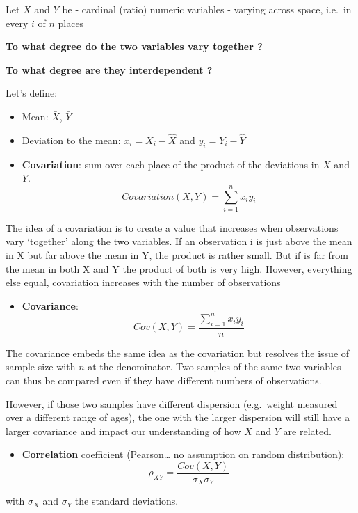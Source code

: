 \documentclass[
  letterpaper,
  DIV=11,
  numbers=noendperiod]{scrreprt}
\providecommand{\tightlist}{%
  \setlength{\itemsep}{0pt}\setlength{\parskip}{0pt}}\usepackage{longtable,booktabs,array}
\begin{document}
Let \(X\) and \(Y\) be - cardinal (ratio) numeric variables - varying
across space, i.e.~in every \(i\) of \(n\) places

\textbf{To what degree do the two variables vary together ?}

\textbf{To what degree are they interdependent ?}

Let's define:

\begin{itemize}
\item
  Mean: \(\bar{X}\), \(\bar{Y}\)
\item
  Deviation to the mean: \(x_i = X_i - \hat{X}\) and
  \(y_i = Y_i - \hat{Y}\)
\item
  \textbf{Covariation}: sum over each place of the product of the
  deviations in \(X\) and \(Y\).
  \[Covariation (X,Y) = \sum_{i=1}^n x_i y_i\]
\end{itemize}

The idea of a covariation is to create a value that increases when
observations vary `together' along the two variables. If an observation
i is just above the mean in X but far above the mean in Y, the product
is rather small. But if is far from the mean in both X and Y the product
of both is very high. However, everything else equal, covariation
increases with the number of observations

\begin{itemize}
\tightlist
\item
  \textbf{Covariance}: \[Cov(X,Y) = \dfrac {\sum_{i=1}^n x_i y_i} {n}\]
\end{itemize}

The covariance embeds the same idea as the covariation but resolves the
issue of sample size with \(n\) at the denominator. Two samples of the
same two variables can thus be compared even if they have different
numbers of observations.

However, if those two samples have different dispersion (e.g.~weight
measured over a different range of ages), the one with the larger
dispersion will still have a larger covariance and impact our
understanding of how \(X\) and \(Y\) are related.

\begin{itemize}
\tightlist
\item
  \textbf{Correlation} coefficient (Pearson\ldots{} no assumption on
  random distribution):
  \[\rho_{XY} = \dfrac {Cov(X,Y)} {\sigma_X \sigma_Y}\]
\end{itemize}

with \(\sigma_X\) and \(\sigma_Y\) the standard deviations.
\end{document}
